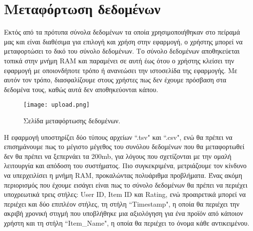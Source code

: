 \section{Μεταφόρτωση δεδομένων}
\noindent Εκτός από τα πρότυπα σύνολα δεδομένων τα οποία χρησιμοποιήθηκαν στο πείραμά μας και είναι διαθέσιμα για επιλογή και χρήση στην εφαρμογή, ο χρήστης μπορεί να μεταφορτώσει το δικό του σύνολο δεδομένων. Το σύνολο δεδομένων αποθηκεύεται τοπικά στην μνήμη RAM και παραμένει σε αυτή έως ότου ο χρήστης κλείσει την εφαρμογή με οποιονδήποτε τρόπο ή ανανεώσει την ιστοσελίδα της εφαρμογής. Με αυτόν τον τρόπο, διασφαλίζουμε στους χρήστες πως δεν έχουμε πρόσβαση στα δεδομένα τους, καθώς αυτά δεν αποθηκεύονται κάπου.\\
\begin{figure}[H]
	\centering
	\texttt{[image: upload.png]}
	\caption{Σελίδα μεταφόρτωσης δεδομένων.}
	\label{fig:upload}
\end{figure}
\noindent Η εφαρμογή υποστηρίζει δύο τύπους αρχείων ``.tsv" και ``.csv", ενώ θα πρέπει να επισημάνουμε πως το μέγιστο μέγεθος του συνόλου δεδομένων που θα μεταφορτωθεί δεν θα πρέπει να ξεπερνάει τα 200mb, για λόγους που σχετίζονται με την ομαλή λειτουργία και απόδοση του συστήματος. Πιο συγκεκριμένα, μετριάζουμε τον κίνδυνο να υπερχειλίσει η μνήμη RAM, προκαλώντας πολυάριθμα προβλήματα. Ένας ακόμη περιορισμός που έχουμε εισάγει είναι πως το σύνολο δεδομένων θα πρέπει να περιέχει υποχρεωτικά τρεις στήλες: User ID, Item ID και Rating, ενώ προαιρετικά μπορεί να περιέχει και δύο επιπλέον στήλες, τη στήλη ``Timestamp", η οποία θα περιέχει την ακριβή χρονική στιγμή που υποβλήθηκε μια αξιολόγηση για ένα προϊόν από κάποιον χρήστη και τη στήλη ``Item\_Name", η οποία θα περιέχει το όνομα κάθε αντικειμένου.


